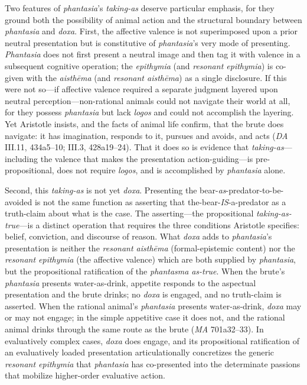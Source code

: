 \documentclass{article}
\begin{document}
Two features of \textit{phantasia}'s \textit{taking-as} deserve particular emphasis, for they ground both the possibility of animal action and the structural boundary between \textit{phantasia} and \textit{doxa}. First, the affective valence is not superimposed upon a prior neutral presentation but is constitutive of \textit{phantasia}'s very mode of presenting. \textit{Phantasia} does not first present a neutral image and then tag it with valence in a subsequent cognitive operation; the \textit{epithymia} (and \textit{resonant epithymia}) is co-given with the \textit{aisthēma} (and \textit{resonant aisthēma}) as a single disclosure. If this were not so---if affective valence required a separate judgment layered upon neutral perception---non-rational animals could not navigate their world at all, for they possess \textit{phantasia} but lack \textit{logos} and could not accomplish the layering. Yet Aristotle insists, and the facts of animal life confirm, that the brute does navigate: it has imagination, responds to it, pursues and avoids, and acts (\textit{DA} III.11, 434a5--10; III.3, 428a19--24). That it does so is evidence that \textit{taking-as}---including the valence that makes the presentation action-guiding---is pre-propositional, does not require \textit{logos}, and is accomplished by \textit{phantasia} alone.

Second, this \textit{taking-as} is not yet \textit{doxa}. Presenting the bear-\textit{as}-predator-to-be-avoided is not the same function as asserting that the-bear-\textit{IS}-a-predator as a truth-claim about what is the case. The asserting---the propositional \textit{taking-as-true}---is a distinct operation that requires the three conditions Aristotle specifies: belief, conviction, and discourse of reason. What \textit{doxa} adds to \textit{phantasia}'s presentation is neither the \textit{resonant aisthēma} (formal-epistemic content) nor the \textit{resonant epithymia} (the affective valence) which are both supplied by \textit{phantasia}, but the propositional ratification of the \textit{phantasma} \textit{as-true}. When the brute's \textit{phantasia} presents water-as-drink, appetite responds to the aspectual presentation and the brute drinks; no \textit{doxa} is engaged, and no truth-claim is asserted. When the rational animal's \textit{phantasia} presents water-as-drink, \textit{doxa} may or may not engage; in the simple appetitive case it does not, and the rational animal drinks through the same route as the brute (\textit{MA} 701a32--33). In evaluatively complex cases, \textit{doxa} does engage, and its propositional ratification of an evaluatively loaded presentation articulationally concretizes the generic \textit{resonant epithymia} that \textit{phantasia} has co-presented into the determinate passions that mobilize higher-order evaluative action.
\end{document}
